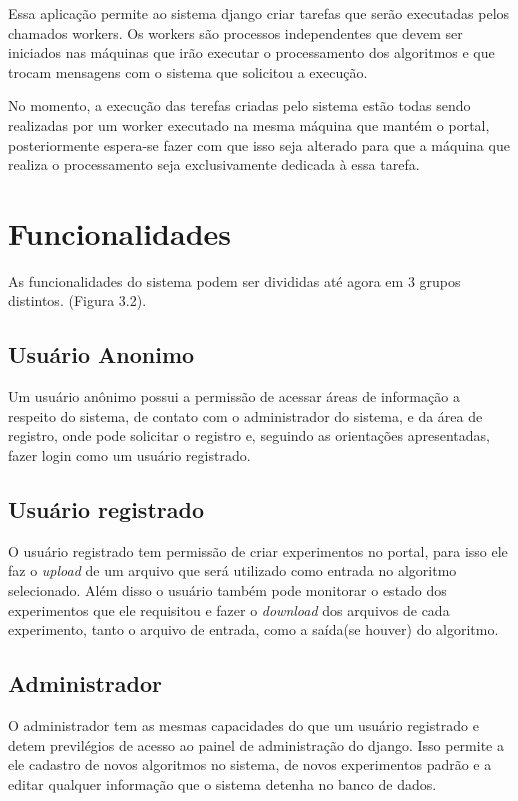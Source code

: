 \documentclass[tg]{mdtufsm}
\begin{document}
Essa aplicação permite ao sistema django criar tarefas que serão executadas pelos chamados workers. Os workers são processos independentes que devem ser iniciados nas máquinas que irão executar o processamento dos algoritmos e que trocam mensagens com o sistema que solicitou a execução.

No momento, a execução das terefas criadas pelo sistema estão todas sendo realizadas por um worker executado na mesma máquina que mantém o portal, posteriormente espera-se fazer com que isso seja alterado para que a máquina que realiza o processamento seja exclusivamente dedicada à essa tarefa.

\section{Funcionalidades}
As funcionalidades do sistema podem ser divididas até agora em 3 grupos distintos. (Figura 3.2).
\subsection{Usuário Anonimo}
Um usuário anônimo possui a permissão de acessar áreas de informação a respeito do sistema, de contato com o administrador do sistema, e da área de registro, onde pode solicitar o registro e, seguindo as orientações apresentadas, fazer login como um usuário registrado.
\subsection{Usuário registrado}
O usuário registrado tem permissão de criar experimentos no portal, para isso ele faz o \emph{upload} de um arquivo que será utilizado como entrada no algoritmo selecionado. Além disso o usuário também pode monitorar o estado dos experimentos que ele requisitou e fazer o \emph{download} dos arquivos de cada experimento, tanto o arquivo de entrada, como a saída(se houver) do algoritmo.
\subsection{Administrador}
O administrador tem as mesmas capacidades do que um usuário registrado e detem previlégios de acesso ao painel de administração do django. Isso permite a ele cadastro de novos algoritmos no sistema, de novos experimentos padrão e a editar qualquer informação que o sistema detenha no banco de dados.
\end{document}
